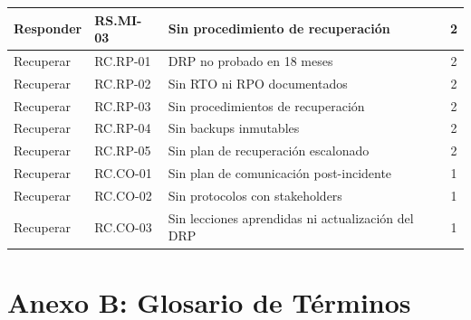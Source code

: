 \documentclass[11pt,a4paper]{article}
\begin{document}
\begin{longtable}{@{}p{2cm}p{2cm}p{6.5cm}c@{}}
		Responder & RS.MI-03 & Sin procedimiento de recuperación & 2 \\ \midrule
		Recuperar & RC.RP-01 & DRP no probado en 18 meses & 2 \\
		Recuperar & RC.RP-02 & Sin RTO ni RPO documentados & 2 \\
		Recuperar & RC.RP-03 & Sin procedimientos de recuperación & 2 \\
		Recuperar & RC.RP-04 & Sin backups inmutables & 2 \\
		Recuperar & RC.RP-05 & Sin plan de recuperación escalonado & 2 \\
		Recuperar & RC.CO-01 & Sin plan de comunicación post-incidente & 1 \\
		Recuperar & RC.CO-02 & Sin protocolos con stakeholders & 1 \\
		Recuperar & RC.CO-03 & Sin lecciones aprendidas ni actualización del DRP & 1 \\ \bottomrule
	\end{longtable}
	
	\newpage
	
	\section{Anexo B: Glosario de Términos}
	
\end{document}
